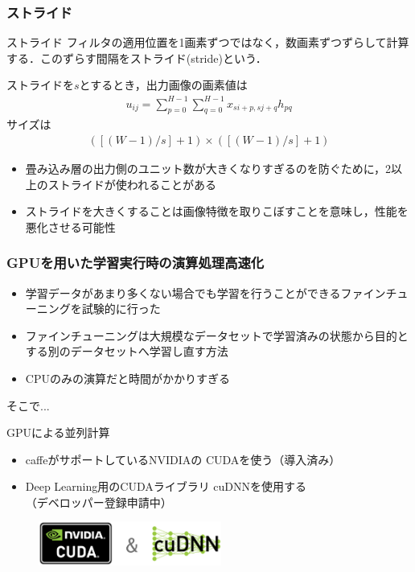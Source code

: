 \documentclass[dvipdfmx,11pt,notheorems]{beamer}
\theoremstyle{definition}
\begin{document}
\begin{frame}[fragile]\frametitle{ストライド}
\begin{block}{ストライド}
フィルタの適用位置を1画素ずつではなく，数画素ずつずらして計算する．このずらす間隔をストライド(stride)という．
\end{block}
ストライドを$s$とするとき，出力画像の画素値は
\begin{eqnarray}
 u_{ij} = \sum^{H-1}_{p=0}\sum^{H-1}_{q=0} x_{si+p,sj+q}h_{pq}
\end{eqnarray}
サイズは
\begin{eqnarray}
 \left(\left[\left(W-1\right)/s\right]+1\right)\times \left(\left[\left(W-1\right)/s\right]+1\right)
\end{eqnarray}
\begin{itemize}
 \item 畳み込み層の出力側のユニット数が大きくなりすぎるのを防ぐために，2以上のストライドが使われることがある
 \item ストライドを大きくすることは画像特徴を取りこぼすことを意味し，性能を悪化させる可能性
\end{itemize}

\end{frame}

\begin{frame}\frametitle{GPUを用いた学習実行時の演算処理高速化}
\begin{itemize}
\item 学習データがあまり多くない場合でも学習を行うことができるファインチューニングを試験的に行った
\item ファインチューニングは大規模なデータセットで学習済みの状態から目的とする別のデータセットへ学習し直す方法
\item CPUのみの演算だと時間がかかりすぎる
\end{itemize}

そこで...
\begin{block}{GPUによる並列計算}
\begin{itemize}
\item caffeがサポートしているNVIDIAの{\color{orange} CUDA}を使う（導入済み）
\item Deep Learning用のCUDAライブラリ{\color{orange} cuDNN}を使用する\\（デベロッパー登録申請中）
\end{itemize}
\end{block}

\begin{figure}[tb]
  \begin{center}
    \includegraphics[clip,width=6cm]{./fig/eps/GPU.eps}
  \end{center}
\end{figure}

\end{frame}
\end{document}
